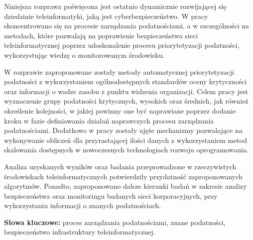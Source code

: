 Niniejsza rozprawa poświęcona jest ostatnio dynamicznie rozwijającej się dziedzinie teleinformatyki, jaką jest cyberbezpieczeństwo. W pracy skoncentrowano się na procesie zarządzania podatnościami, a w szczególności na metodach, które pozwalają na poprawienie bezpieczeństwa sieci teleinformatycznej poprzez udoskonalenie procesu priorytetyzacji podatności, wykorzystując wiedzę o monitorowanym środowisku.

\bigbreak
W rozprawie zaproponowane zostały metody automatycznej priorytetyzacji podatności z wykorzystaniem ogólnodostępnych standardów oceny krytyczności oraz informacji o wadze zasobu z punktu widzenia organizacji. Celem pracy jest wyznaczenie grupy podatności krytycznych, wysokich oraz średnich, jak również określenie kolejności, w jakiej powinny one być naprawiane poprzez dodanie kroku w fazie definiowania działań naprawczych procesu zarządzania podatnościami. Dodatkowo w pracy zostały ujęte mechanizmy pozwalające na wykonywanie obliczeń dla przyrastającej ilości danych z wykorzystaniem metod skalowania dostępnych w nowoczesnych technologiach rozwoju oprogramowania.

\bigbreak
Analiza uzyskanych wyników oraz badania przeprowadzone w rzeczywistych środowiskach teleinformatycznych potwierdziły przydatność zaproponowanych algorytmów. Ponadto, zaproponowano dalsze kierunki badań w zakresie analizy bezpieczeństwa oraz monitoringu badanych sieci korporacyjnych, przy wykorzystaniu informacji o znanych podatnościach.

\vspace*{1cm}
\textbf{Słowa kluczowe:} proces zarządzania podatnościami, znane podatności, bezpieczeństwo infrastruktury teleinformatycznej.
